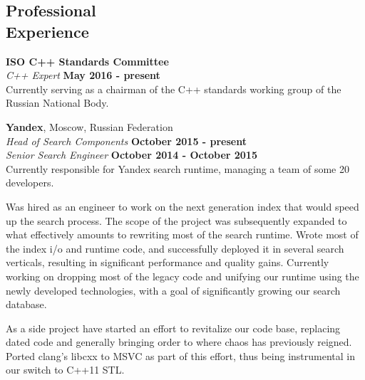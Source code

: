 \documentclass[margin,line]{CV}
\begin{document}
\begin{resume}
    
    
    \section{\mysidestyle Professional\\Experience}
    \textbf{ISO C++ Standards Committee} \vspace{2mm}\\\vspace{1mm}%
    \textsl{C++ Expert} \hfill \textbf{May 2016 - present}\\\vspace{1mm}%
    Currently serving as a chairman of the C++ standards working group of the Russian National Body.

    
    
    \textbf{Yandex}, Moscow, Russian Federation \vspace{2mm}\\\vspace{1mm}%
    \textsl{Head of Search Components} \hfill \textbf{October 2015 - present}\\\vspace{1mm}%
    \textsl{Senior Search Engineer} \hfill \textbf{October 2014 - October 2015}\\
    Currently responsible for Yandex search runtime, managing a team of some 20 developers.
    
    Was hired as an engineer to work on the next generation index that would speed up the search process. The scope of the project was subsequently expanded to what effectively amounts to rewriting most of the search runtime. Wrote most of the index i/o and runtime code, and successfully deployed it in several search verticals, resulting in significant performance and quality gains. Currently working on dropping most of the legacy code and unifying our runtime using the newly developed technologies, with a goal of significantly growing our search database.
    
    As a side project have started an effort to revitalize our code base, replacing dated code and generally bringing order to where chaos has previously reigned. Ported clang's libcxx to MSVC as part of this effort, thus being instrumental in our switch to C++11 STL.


\end{resume}
\end{document}
